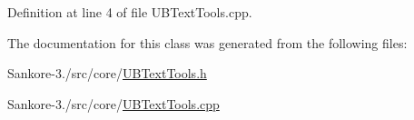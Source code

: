 Definition at line 4 of file U\-B\-Text\-Tools.\-cpp.



The documentation for this class was generated from the following files\-:\begin{DoxyCompactItemize}
\item 
Sankore-\/3./src/core/\hyperlink{_u_b_text_tools_8h}{U\-B\-Text\-Tools.\-h}\item 
Sankore-\/3./src/core/\hyperlink{_u_b_text_tools_8cpp}{U\-B\-Text\-Tools.\-cpp}\end{DoxyCompactItemize}
